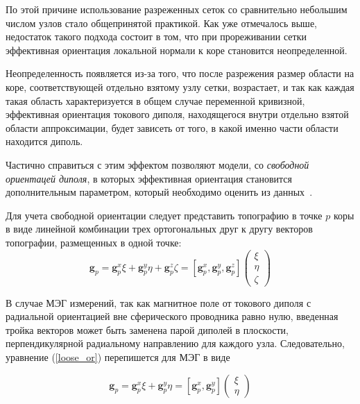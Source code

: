 По этой причине использование разреженных сеток со сравнительно небольшим числом узлов стало
общепринятой практикой. Как уже отмечалось выше, недостаток такого подхода состоит в том, что 
при прореживании сетки эффективная ориентация локальной нормали к коре становится неопределенной.

Неопределенность появляется из-за того, что после разрежения размер области на коре, соответствующей отдельно
взятому узлу сетки, возрастает, и так как каждая такая область характеризуется в общем случае
переменной кривизной, эффективная ориентация токового диполя, находящегося внутри отдельно взятой области аппроксимации, будет зависеть от того, в какой именно части области находится диполь.

Частично справиться с этим эффектом позволяют модели, со \emph{свободной ориентацей диполя}, в которых эффективная ориентация становится дополнительным параметром, который необходимо оценить из данных~\cite{Lin2006}.

Для учета свободной ориентации следует представить топографию в точке $p$ коры в виде линейной комбинации трех ортогональных друг к другу векторов топографии, размещенных в одной точке:
\begin{equation}
    \mathbf{g}_p = \mathbf{g}_p^x \xi + \mathbf{g}_p^y \eta + \mathbf{g}_p^z \zeta = [\mathbf{g}_p^x, \mathbf{g}_p^y, \mathbf{g}_p^z] \left( 
    \begin{array}{ccc}
        \xi \\
        \eta \\
        \zeta
    \end{array}
    \right)
    \label{loose_or}
\end{equation}

В случае МЭГ измерений, так как магнитное поле от токового диполя с радиальной ориентацией вне сферического проводника равно нулю, введенная тройка векторов может быть заменена парой диполей в плоскости, перпендикулярной радиальному направлению для каждого узла. Следовательно, уравнение (\ref{loose_or}) перепишется для МЭГ в виде

\begin{equation}
    \mathbf{g}_p = \mathbf{g}_p^x \xi + \mathbf{g}_p^y \eta = [\mathbf{g}_p^x, \mathbf{g}_p^y] \left( 
    \begin{array}{ccc}
        \xi \\
        \eta 
    \end{array}
    \right)
    \label{loose_or_meg}
\end{equation}

